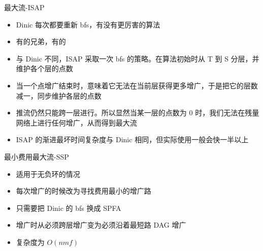 ﻿\documentclass[aspectratio=169]{ctexbeamer}
\begin{document}
\begin{frame}{最大流-ISAP}
    \begin{itemize}
        \item Dinic 每次都要重新 bfs，有没有更厉害的算法
        \item 有的兄弟，有的
        \item 与 Dinic 不同，ISAP 采取一次 bfs 的策略。在算法初始时从 T 到 S 分层，并维护各个层的点数
        \item 当一个点增广结束时，意味着它无法在当前层获得更多增广，于是把它的层数减一，同步维护各层的点数
        \item 推流仍然只能跨一层进行。所以显然当某一层的点数为 $ 0 $ 时，我们无法在残量网络上进行任何增广，从而得到最大流
        \item ISAP 的渐进最坏时间复杂度与 Dinic 相同，但实际使用一般会快一半以上
    \end{itemize}
\end{frame}

\begin{frame}{最小费用最大流-SSP}
    \begin{itemize}
        \item 适用于无负环的情况
        \item 每次增广的时候改为寻找费用最小的增广路
        \item 只需要把 Dinic 的 bfs 换成 SPFA
        \item 增广时从必须跨层增广变为必须沿着最短路 DAG 增广
        \item 复杂度为 $O(nmf)$
    \end{itemize}
\end{frame}




\end{document}

